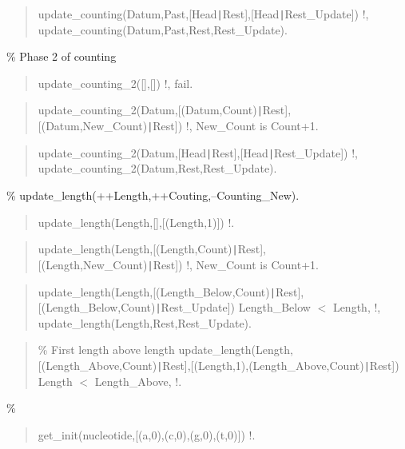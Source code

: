 \begin{quote}
update_counting(Datum,Past,[Head{\tt\string|}Rest],[Head{\tt\string|}Rest_Update]) \Sneck{}
!,
update_counting(Datum,Past,Rest,Rest_Update).
\end{quote}

\% Phase 2 of counting

\begin{quote}
update_counting_2([],[]) \Sneck{}
!,
fail.
\end{quote}

\begin{quote}
update_counting_2(Datum,[(Datum,Count){\tt\string|}Rest],[(Datum,New_Count){\tt\string|}Rest])\Sneck{}
!,
New_Count is Count+1.
\end{quote}

\begin{quote}
update_counting_2(Datum,[Head{\tt\string|}Rest],[Head{\tt\string|}Rest_Update]) \Sneck{}
!,
update_counting_2(Datum,Rest,Rest_Update).
\end{quote}

\% update_length(++Length,++Couting,--Counting_New).

\begin{quote}
update_length(Length,[],[(Length,1)]) \Sneck{}
!.
\end{quote}

\begin{quote}
update_length(Length,[(Length,Count){\tt\string|}Rest],[(Length,New_Count){\tt\string|}Rest]) \Sneck{}
!,
New_Count is Count+1.
\end{quote}

\begin{quote}
update_length(Length,[(Length_Below,Count){\tt\string|}Rest],[(Length_Below,Count){\tt\string|}Rest_Update]) \Sneck{}
Length_Below $<$ Length,
!,
update_length(Length,Rest,Rest_Update).
\end{quote}

\begin{quote}
\% First length above length
update_length(Length,[(Length_Above,Count){\tt\string|}Rest],[(Length,1),(Length_Above,Count){\tt\string|}Rest]) \Sneck{}
Length $<$ Length_Above,
!.
\end{quote}

\% 

\begin{quote}
get_init(nucleotide,[(a,0),(c,0),(g,0),(t,0)]) \Sneck{}
!.
\end{quote}

